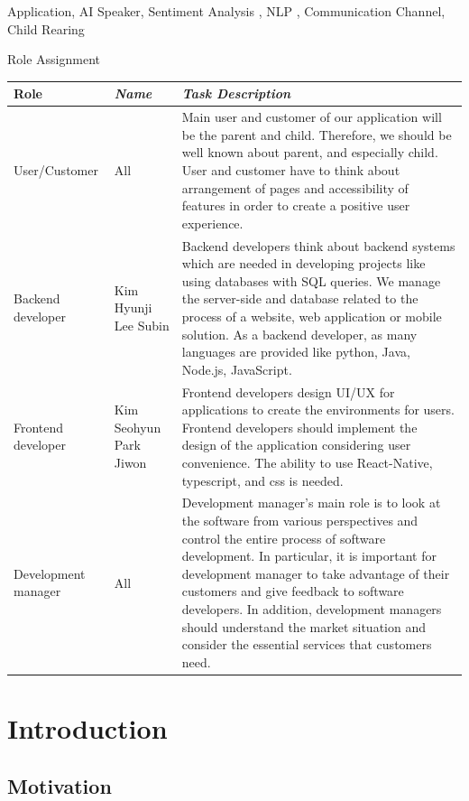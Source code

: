 \documentclass[conference]{IEEEtran}
\begin{document}
\begin{IEEEkeywords}
Application, AI Speaker, Sentiment Analysis , NLP , Communication Channel, Child Rearing
\end{IEEEkeywords}


\newpage
{\large{Role Assignment}}
{\renewcommand{\arraystretch}{1.5}%
\begin{table}[h!]
\begin{tabular}{ | p{} | p{} | p{} | }
\cline{1-3} 
\textbf{Role} & \textbf{\textit{Name}}& \textbf{\textit{Task Description}}\\
\hline
User/Customer&All&Main user and customer of our application will be the parent and child. Therefore, we should be well known about parent, and especially child. User and customer have to think about arrangement of pages and accessibility of features in order to create a positive user experience. \\
\hline
Backend developer&Kim Hyunji Lee Subin&Backend developers think about backend systems which are needed in developing projects like using databases with SQL queries. We manage the server-side and database related to the process of a website, web application or mobile solution. As a backend developer, as many languages are provided like python, Java, Node.js, JavaScript.\\
\hline
Frontend developer&Kim Seohyun Park Jiwon&Frontend developers design UI/UX for applications to create the environments for users. Frontend developers should implement the design of the application considering user convenience. The ability to use React-Native, typescript, and css is needed.\\
\hline
Development manager&All&Development manager’s main role is to look at the software from various perspectives and control the entire process of software development. In particular, it is important for development manager to take advantage of their customers and give feedback to software developers. In addition, development managers should understand the market situation and consider the essential services that customers need.\\
\hline
\end{tabular}
\end{table}}
\newpage


\section{\large{Introduction}}
\subsection{\large{Motivation}}
\end{document}
